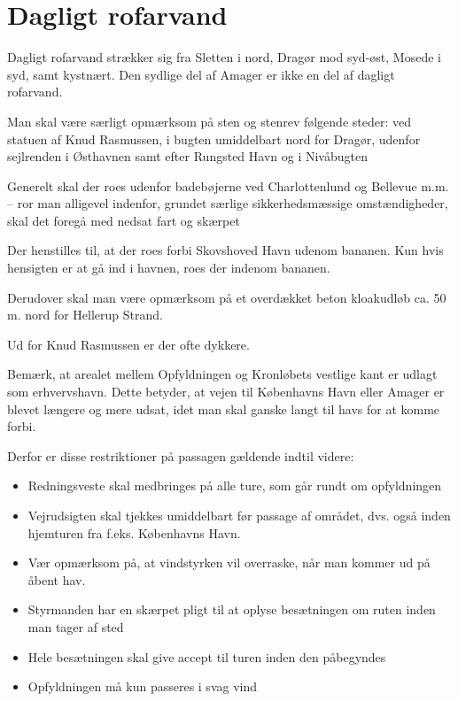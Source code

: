 \documentclass{article}
\begin{document}
\section{Dagligt rofarvand}

Dagligt rofarvand strækker sig fra Sletten i nord, Dragør mod syd-øst,
Mosede i syd, samt kystnært. Den sydlige del af Amager er ikke en del af
dagligt rofarvand.

Man skal være særligt opmærksom på sten og stenrev følgende steder: ved
statuen af Knud Rasmussen, i bugten umiddelbart nord for Dragør, udenfor
sejlrenden i Østhavnen samt efter Rungsted Havn og i Nivåbugten

Generelt skal der roes udenfor badebøjerne ved Charlottenlund og Bellevue
m.m. – ror man alligevel indenfor, grundet særlige sikkerhedsmæssige
omstændigheder, skal det foregå med nedsat fart og skærpet

Der henstilles til, at der roes forbi Skovshoved Havn udenom bananen. Kun
hvis hensigten er at gå ind i havnen, roes der indenom bananen.

Derudover skal man være opmærksom på et overdækket beton kloakudløb ca.
50 m. nord for Hellerup Strand.

Ud for Knud Rasmussen er der ofte dykkere.

Bemærk, at arealet mellem Opfyldningen og Kronløbets vestlige kant er
udlagt som erhvervshavn.  Dette betyder, at vejen til Københavns Havn
eller Amager er blevet længere og mere udsat, idet man skal ganske langt
til havs for at komme forbi.

Derfor er disse restriktioner på passagen gældende indtil videre:

\begin{itemize} \item Redningsveste skal medbringes på alle ture, som går
        rundt om opfyldningen \item Vejrudsigten skal tjekkes umiddelbart
            før passage af området, dvs. også inden hjemturen fra f.eks.
            Københavns Havn.  \item Vær opmærksom på, at vindstyrken vil
            overraske, når man kommer ud på åbent hav.  \item Styrmanden
                har en skærpet pligt til at oplyse besætningen om ruten
                inden man tager af sted \item Hele besætningen skal give
accept til turen inden den påbegyndes \item Opfyldningen må kun passeres
i svag vind \end{itemize}
\end{document}
